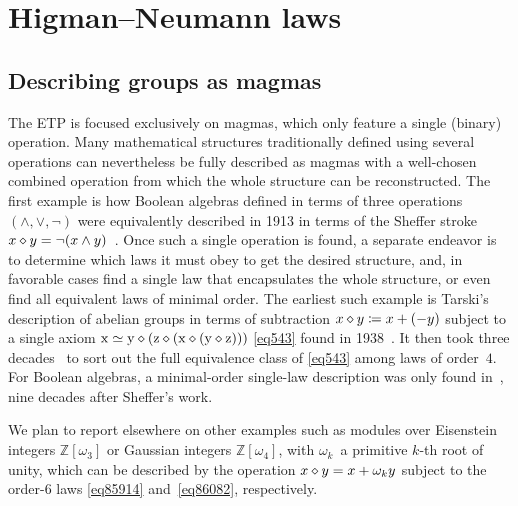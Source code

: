 \section{Higman--Neumann laws}\label{higman-neumann}

\subsection{Describing groups as magmas}

The ETP is focused exclusively on magmas, which only feature a single (binary) operation.  Many mathematical structures traditionally defined using several operations can nevertheless be fully described as magmas with a well-chosen combined operation from which the whole structure can be reconstructed.  The first example is how Boolean algebras defined in terms of three operations $(\land,\lor,\lnot)$ were equivalently described in 1913 in terms of the Sheffer stroke $x\diamond y=\lnot(x\land y)$~\cite{sheffer1913set}.  Once such a single operation is found, a separate endeavor is to determine which laws it must obey to get the desired structure, and, in favorable cases find a single law that encapsulates the whole structure, or even find all equivalent laws of minimal order.  The earliest such example is Tarski's description of abelian groups in terms of subtraction $x\diamond y\coloneqq x+(-y)$ subject to a single axiom $\mathrm{x} \simeq \mathrm{y} \diamond (\mathrm{z} \diamond (\mathrm{x} \diamond (\mathrm{y} \diamond \mathrm{z})))$ \eqref{eq543} found in 1938~\cite{Tarski1938}.  It then took three decades~\cite{higman-neumann,Sholander01021959,Padmanabhan_1969} to sort out the full equivalence class of \eqref{eq543} among laws of order~$4$.  For Boolean algebras, a minimal-order single-law description was only found in~\cite{mccune_et_al}, nine decades after Sheffer's work.

We plan to report elsewhere on other examples such as modules over Eisenstein integers $\mathbb{Z}[\omega_3]$ or Gaussian integers $\mathbb{Z}[\omega_4]$, with $\omega_k$~a primitive $k$-th root of unity, which can be described by the operation $x \diamond y = x + \omega_k y$ subject to the order-$6$ laws \eqref{eq85914} and~\eqref{eq86082}, respectively.

